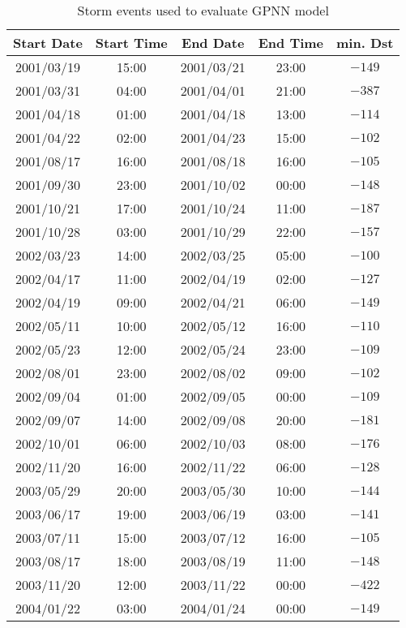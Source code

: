 \begin{table}[h]
	\fontsize{8}{9.6}\selectfont
	\centering
	\caption{Storm events used to evaluate GPNN model}
	\label{table:teststormsgpnn}
	\begin{tabular}{ccccc}
	\hline
	Start Date & Start Time & End Date & End Time & min. Dst \\ \hline
	2001/03/19 & 15:00 & 2001/03/21 & 23:00 & $ -149 $ \\
	2001/03/31 & 04:00 & 2001/04/01 & 21:00 & $ -387 $ \\
	2001/04/18 & 01:00 & 2001/04/18 & 13:00 & $ -114 $ \\
	2001/04/22 & 02:00 & 2001/04/23 & 15:00 & $ -102 $ \\
	2001/08/17 & 16:00 & 2001/08/18 & 16:00 & $ -105 $ \\
	2001/09/30 & 23:00 & 2001/10/02 & 00:00 & $ -148 $ \\
	2001/10/21 & 17:00 & 2001/10/24 & 11:00 & $ -187 $ \\
	2001/10/28 & 03:00 & 2001/10/29 & 22:00 & $ -157 $ \\
	2002/03/23 & 14:00 & 2002/03/25 & 05:00 & $ -100 $ \\
	2002/04/17 & 11:00 & 2002/04/19 & 02:00 & $ -127 $ \\
	2002/04/19 & 09:00 & 2002/04/21 & 06:00 & $ -149 $ \\
	2002/05/11 & 10:00 & 2002/05/12 & 16:00 & $ -110 $ \\
	2002/05/23 & 12:00 & 2002/05/24 & 23:00 & $ -109 $ \\
	2002/08/01 & 23:00 & 2002/08/02 & 09:00 & $ -102 $ \\
	2002/09/04 & 01:00 & 2002/09/05 & 00:00 & $ -109 $ \\
	2002/09/07 & 14:00 & 2002/09/08 & 20:00 & $ -181 $ \\
	2002/10/01 & 06:00 & 2002/10/03 & 08:00 & $ -176 $ \\
	2002/11/20 & 16:00 & 2002/11/22 & 06:00 & $ -128 $ \\
	2003/05/29 & 20:00 & 2003/05/30 & 10:00 & $ -144 $ \\
	2003/06/17 & 19:00 & 2003/06/19 & 03:00 & $ -141 $ \\
	2003/07/11 & 15:00 & 2003/07/12 & 16:00 & $ -105 $ \\
	2003/08/17 & 18:00 & 2003/08/19 & 11:00 & $ -148 $ \\
	2003/11/20 & 12:00 & 2003/11/22 & 00:00 & $ -422 $ \\
	2004/01/22 & 03:00 & 2004/01/24 & 00:00 & $ -149 $ \\

\end{tabular}
\end{table}

